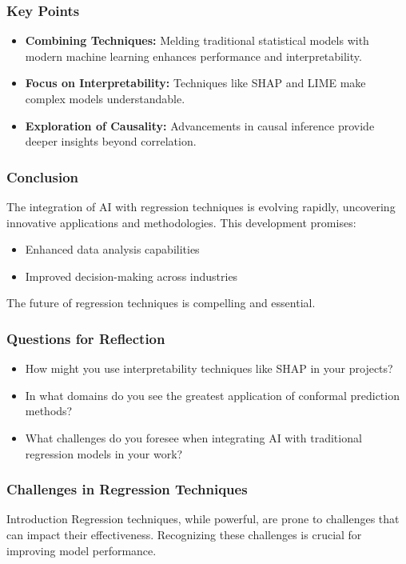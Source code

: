 \documentclass[aspectratio=169]{beamer}
\begin{document}
\begin{frame}[fragile]
    \frametitle{Key Points}
    \begin{itemize}
        \item \textbf{Combining Techniques:} Melding traditional statistical models with modern machine learning enhances performance and interpretability.
        \item \textbf{Focus on Interpretability:} Techniques like SHAP and LIME make complex models understandable.
        \item \textbf{Exploration of Causality:} Advancements in causal inference provide deeper insights beyond correlation.
    \end{itemize}
\end{frame}

\begin{frame}[fragile]
    \frametitle{Conclusion}
    The integration of AI with regression techniques is evolving rapidly, uncovering innovative applications and methodologies. This development promises:
    \begin{itemize}
        \item Enhanced data analysis capabilities
        \item Improved decision-making across industries 
    \end{itemize}
    The future of regression techniques is compelling and essential.
\end{frame}

\begin{frame}[fragile]
    \frametitle{Questions for Reflection}
    \begin{itemize}
        \item How might you use interpretability techniques like SHAP in your projects?
        \item In what domains do you see the greatest application of conformal prediction methods?
        \item What challenges do you foresee when integrating AI with traditional regression models in your work?
    \end{itemize}
\end{frame}

\begin{frame}[fragile]
    \frametitle{Challenges in Regression Techniques}
    \begin{block}{Introduction}
        Regression techniques, while powerful, are prone to challenges that can impact their effectiveness. Recognizing these challenges is crucial for improving model performance.
    \end{block}
\end{frame}
\end{document}
